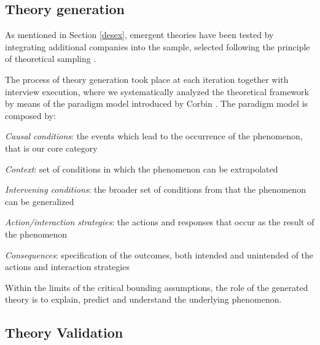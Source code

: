 \documentclass[10pt,journal,letterpaper,compsoc]{IEEEtran}
\begin{document}
\subsection{Theory generation}

As mentioned in Section \ref{desex}, emergent theories have been tested by 
integrating additional companies into the sample, selected following the 
principle of theoretical sampling \cite{Yin1994}. 

The process of theory generation took place at each iteration together with 
interview execution, where we systematically analyzed the theoretical framework 
by means of the paradigm model introduced by Corbin \cite{Corbin1990}. The 
paradigm model is composed by: 

\begin{compactitem}
\item \textit{Causal conditions}: the events which lead to the occurrence of 
the phenomenon, that is our core category
\item \textit{Context}: set of conditions in which the phenomenon can be 
extrapolated
\item \textit{Intervening conditions}: the broader set of conditions from that 
the phenomenon can be generalized
\item \textit{Action/interaction strategies}: the actions and responses that 
occur as the result of the phenomenon
\item \textit{Consequences}: specification of the outcomes, both intended and 
unintended of the actions and interaction strategies
\end{compactitem}

Within the limits of the critical bounding assumptions, the role of the 
generated theory is to explain, predict and understand the underlying 
phenomenon.

\subsection{Theory Validation}
\label{rm:val}
\end{document}
